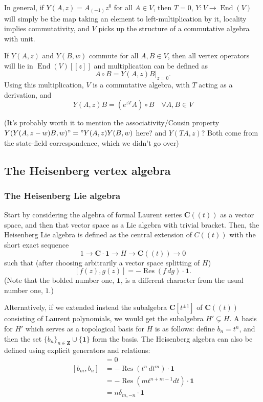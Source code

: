 \documentclass{article}
\newcommand{\CC}{\mathbold{C}}
\newcommand{\ZZ}{\mathbold{Z}}
\newcommand{\one}{\mathbold{1}}
\DeclareMathOperator{\Res}{Res}
\DeclareMathOperator{\End}{End}
\begin{document}
In general, if $Y(A,z)=A_{(-1)}z^0$ for all $A \in V$, then $T=0$, $Y: V \rightarrow \End(V)$ will simply be the map taking an element to left-multiplication by it, locality implies commutativity, and $V$ picks up the structure of a commutative algebra with unit.

If $Y(A,z)$ and $Y(B,w)$ commute for all $A,B \in V$, then all vertex operators will lie in $\End(V)[[z]]$ and multiplication can be defined as
\[A \circ B = Y(A,z)B|_{z=0}. \]
Using this multiplication, $V$ is a commutative algebra, with $T$ acting as a derivation, and
\[Y(A,z)B=(e^{zT}A) \circ B \quad \forall A,B \in V \]

(It's probably worth it to mention the associativity/Cousin property $Y(Y(A,z-w)B,w)"="Y(A,z)Y(B,w)$ here? and $Y(TA,z)$? Both come from the state-field correspondence, which we didn't go over)

\subsection{The Heisenberg vertex algebra}

\subsubsection{The Heisenberg Lie algebra}


Start by considering the algebra of formal Laurent series $\CC((t))$ as a vector space, and then that vector space as a Lie algebra with trivial bracket.  Then, the Heisenberg Lie algebra is defined as the central extension of $C((t))$ with the short exact sequence
\[1 \rightarrow \CC \cdot \one \rightarrow H \rightarrow \CC((t)) \rightarrow 0 \]
such that (after choosing arbitrarily a vector space splitting of $H$)
\[[f(z),g(z)]=-\Res(f\,dg) \cdot \one. \]
(Note that the bolded number one, $\one$, is a different character from the usual number one, $1$.)  

Alternatively, if we extended instead the subalgebra $\CC[t^{\pm 1}]$ of $\CC((t))$ consisting of Laurent polynomials, we would get the subalgebra $H' \subsetneq H$.  A basis for $H'$ which serves as a topological basis for $H$ is as follows: define $b_n=t^n$, and then the set $\{b_n\}_{n \in \ZZ} \cup \{\one\}$ form the basis.  The Heisenberg algebra can also be defined using explicit generators and relations:
\begin{align}
  [b_n,\one]&=0\\
  [b_m,b_n]&=-\Res(t^n\,dt^m)\cdot\one\\
  &=-\Res(mt^{n+m-1}dt)\cdot\one\\
  &=n\delta_{m,-n}\cdot\one
\end{align}
\end{document}
